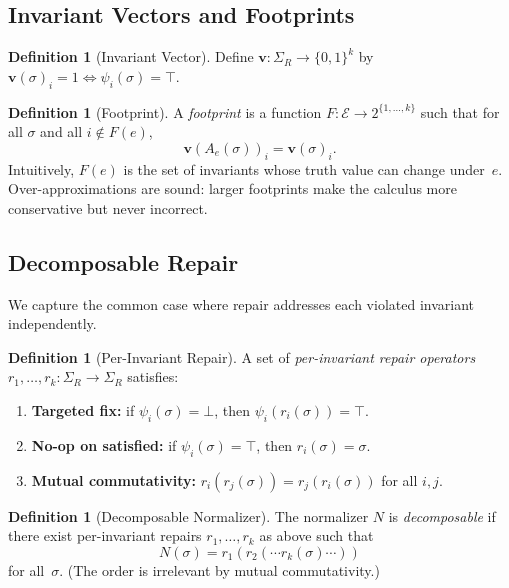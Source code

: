 \documentclass[11pt,a4paper]{article}
\theoremstyle{plain}
\theoremstyle{definition}
\newtheorem{definition}[theorem]{Definition}
\theoremstyle{remark}
\begin{document}
\subsection{Invariant Vectors and Footprints}

\begin{definition}[Invariant Vector]
\label{def:inv-vector}
Define $\mathbf{v}: \Sigma_R \to \{0,1\}^k$ by
$\mathbf{v}(\sigma)_i = 1 \iff \psi_i(\sigma) = \top$.
\end{definition}

\begin{definition}[Footprint]
\label{def:footprint}
A \emph{footprint} is a function $F: \mathcal{E} \to 2^{\{1,\ldots,k\}}$ such
that for all $\sigma$ and all $i \notin F(e)$,
\[
\mathbf{v}(A_e(\sigma))_i = \mathbf{v}(\sigma)_i.
\]
Intuitively, $F(e)$ is the set of invariants whose truth value can change
under~$e$.  Over-approximations are sound: larger footprints make the calculus
more conservative but never incorrect.
\end{definition}

\subsection{Decomposable Repair}

We capture the common case where repair addresses each violated invariant
independently.

\begin{definition}[Per-Invariant Repair]
\label{def:perinv}
A set of \emph{per-invariant repair operators} $r_1, \ldots, r_k :
\Sigma_R \to \Sigma_R$ satisfies:
\begin{enumerate}[leftmargin=*,nosep,label=(R\arabic*)]
\item \textbf{Targeted fix:}\; if $\psi_i(\sigma) = \bot$, then
  $\psi_i(r_i(\sigma)) = \top$.
\item \textbf{No-op on satisfied:}\; if $\psi_i(\sigma) = \top$, then
  $r_i(\sigma) = \sigma$.
\item \textbf{Mutual commutativity:}\; $r_i(r_j(\sigma)) = r_j(r_i(\sigma))$
  for all $i, j$.
\end{enumerate}
\end{definition}

\begin{definition}[Decomposable Normalizer]
\label{def:decomp}
The normalizer $N$ is \emph{decomposable} if there exist per-invariant repairs
$r_1, \ldots, r_k$ as above such that
\[
N(\sigma) = r_1(r_2(\cdots r_k(\sigma) \cdots))
\]
for all~$\sigma$.  (The order is irrelevant by mutual commutativity.)
\end{definition}
\end{document}
